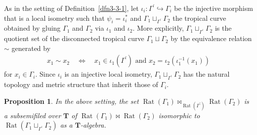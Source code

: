 \documentclass[a4paper,12pt]{amsart}
\newtheorem{prop}[dfn]{Proposition}
\def\Gamma{\varGamma}
\begin{document}
As in the setting of Definition~\ref{dfn3-3-1}, let $\iota_i : \Gamma^{\prime} \hookrightarrow \Gamma_i$ be the injective morphism that is a local isometry such that $\psi_i = \iota_i^{\ast}$ and $\Gamma_1 \sqcup_{\Gamma^{\prime}} \Gamma_2$ the tropical curve obtained by gluing $\Gamma_1$ and $\Gamma_2$ via $\iota_1$ and $\iota_2$.
More explicitly, $\Gamma_1 \sqcup_{\Gamma^{\prime}} \Gamma_2$ is the quotient set of the disconnected tropical curve $\Gamma_1 \sqcup \Gamma_2$ by the equivalence relation $\sim$ generated by
\begin{align*}
x_1 \sim x_2 \quad \Longleftrightarrow \quad x_1 \in \iota_1(\Gamma^{\prime}) \text{ and } x_2 = \iota_2(\iota_1^{-1}(x_1))
\end{align*}
\noindent
for $x_i \in \Gamma_i$.
Since $\iota_i$ is an injective local isometry, $\Gamma_1 \sqcup_{\Gamma^{\prime}} \Gamma_2$ has the natural topology and metric structure that inherit those of $\Gamma_i$.

\begin{prop}
    \label{prop3-3-1}
In the above setting, the set $\operatorname{Rat}(\Gamma_1) \bowtie_{\operatorname{Rat}(\Gamma^{\prime})} \operatorname{Rat}(\Gamma_2)$ is a subsemifiled over $\boldsymbol{T}$ of $\operatorname{Rat}(\Gamma_1) \bowtie \operatorname{Rat}(\Gamma_2)$ isomorphic to $\operatorname{Rat}(\Gamma_1 \sqcup_{\Gamma^{\prime}} \Gamma_2)$ as a $\boldsymbol{T}$-algebra.
\end{prop}
\end{document}
